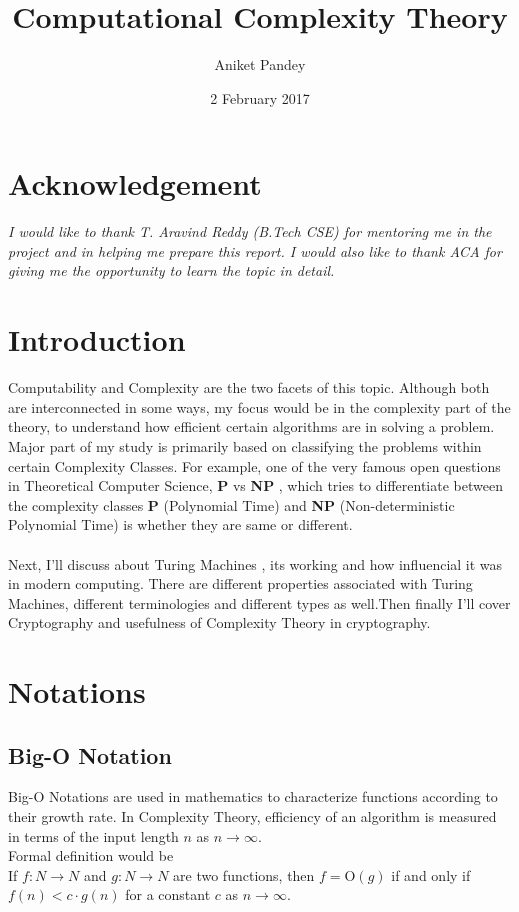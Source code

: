 \documentclass[12pt,a4paper]{extarticle}
\title{Computational Complexity Theory}
\date{2 February 2017}
\author{Aniket Pandey}
\begin{document}
\maketitle

\section{Acknowledgement}
\textit{I would like to thank T. Aravind Reddy (B.Tech CSE) for mentoring me in the project and in helping me prepare this report. I would also like to thank ACA for giving me the opportunity to learn the topic in detail.}

\section{Introduction}
Computability and Complexity are the two facets of this topic. Although both are interconnected in some ways, my focus would be in the complexity part of the theory, to understand how efficient certain algorithms are in solving a problem. Major part of my study is primarily based on classifying the problems within certain Complexity Classes. For example, one of the very famous open questions in Theoretical Computer Science, \textbf{P} vs \textbf{NP} , which tries to differentiate between the complexity classes \textbf{P} (Polynomial Time) and \textbf{NP} (Non-deterministic Polynomial Time) is whether they are same or different.\\\\Next, I'll discuss about Turing Machines , its working and how influencial it was in modern computing. There are different properties associated with Turing Machines, different terminologies and different types as well.Then finally I'll cover Cryptography and usefulness of Complexity Theory in cryptography. 

\section{Notations}
\subsection{Big-O Notation}
Big-O Notations are used in mathematics to characterize functions according to their growth rate. In Complexity Theory, efficiency of an algorithm is measured in terms of the input length $n$ as $n\rightarrow \infty $.\\ Formal definition would be\\If $f:N\rightarrow N$ and $g:N\rightarrow N$ are two functions, then $f=$O$(g)$ if and only if $f(n)<c \cdot g(n)$ for a constant $c$ as $n\rightarrow\infty$.
\newpage
\end{document}
